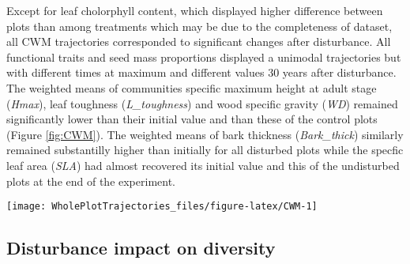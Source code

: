 \documentclass[fleqn,10pt]{ArtEcoFoG} %
\theoremstyle{definition}
\theoremstyle{definition}
\theoremstyle{definition}
\theoremstyle{remark}
\begin{document}
Except for leaf cholorphyll content, which displayed higher difference
between plots than among treatments which may be due to the completeness
of dataset, all CWM trajectories corresponded to significant changes
after disturbance. All functional traits and seed mass proportions
displayed a unimodal trajectories but with different times at maximum
and different values 30 years after disturbance. The weighted means of
communities specific maximum height at adult stage (\emph{Hmax}), leaf
toughness (\emph{L\_toughness}) and wood specific gravity (\emph{WD})
remained significantly lower than their initial value and than these of
the control plots (Figure \ref{fig:CWM}). The weighted means of bark
thickness (\emph{Bark\_thick}) similarly remained substantilly higher
than initially for all disturbed plots while the specfic leaf area
(\emph{SLA}) had almost recovered its initial value and this of the
undisturbed plots at the end of the experiment.















\begin{figure*}

{\centering \texttt{[image: WholePlotTrajectories\_files/figure-latex/CWM-1]} 

}

\caption{Trajectories of the communities weighted means (CWM) over 30 years after disturbance of 4 leaf traits (Leaf thickness, \emph{L\_thickness}, chlorophyll content, \emph{L\_chloro}, toughness, \emph{L\_toughness} and specific area, \emph{SLA}), 2 stem traits (wood specific gravity, \emph{WD}, and bark thickness, \emph{Bark-thick}) and one life trait (Specific maximum height at adult stage, \emph{Hmax}). Trajectories correspond to the median (solid line) and 0.025 and 0.975 percentile (gray envelope) observed after 50 iteration of the taxonomic uncertainty propagation and the missing trait value filling processes. Initial treatments are represented by solid lines colorswith green for control, blue for T1,orange for T2 and red for T3.}\label{fig:CWM}
\end{figure*}

\subsection{Disturbance impact on
diversity}\label{disturbance-impact-on-diversity}
\end{document}

